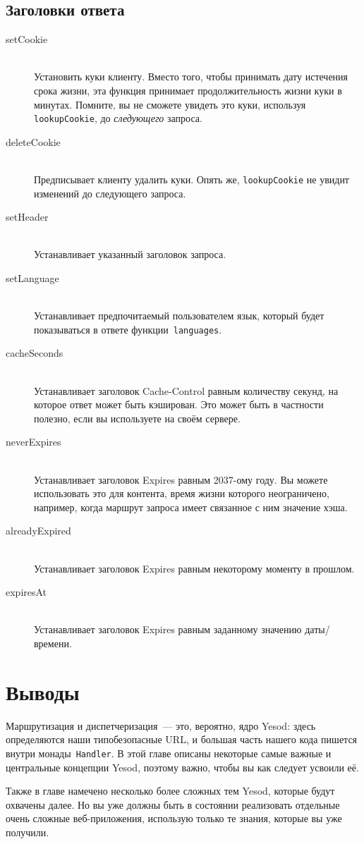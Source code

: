 \subsection{Заголовки ответа}
\begin{description}
\item[setCookie] \hfill \\
Установить куки клиенту. Вместо того, чтобы принимать дату истечения
срока жизни, эта функция принимает продолжительность жизни куки в
минутах. Помните, вы не сможете увидеть это куки, используя
\lstinline!lookupCookie!, до \emph{следующего} запроса.

\item[deleteCookie] \hfill \\
Предписывает клиенту удалить куки. Опять же, \lstinline!lookupCookie! не
увидит изменений до следующего запроса.

\item[setHeader] \hfill \\
Устанавливает указанный заголовок запроса.

\item[setLanguage] \hfill \\
Устанавливает предпочитаемый пользователем язык, который будет
показываться в ответе функции~\lstinline!languages!.

\item[cacheSeconds] \hfill \\
  Устанавливает заголовок Cache-Control равным количеству секунд, на которое
  ответ может быть кэширован. Это может быть в частности полезно, если вы используете
   на своём сервере.

\item[neverExpires] \hfill \\
  Устанавливает заголовок Expires равным 2037-ому году. Вы можете использовать
  это для контента, время жизни которого неограничено, например, когда маршрут запроса
  имеет связанное с ним значение хэша.

\item[alreadyExpired] \hfill \\
Устанавливает заголовок Expires равным некоторому моменту в прошлом.

\item[expiresAt] \hfill \\
Устанавливает заголовок Expires равным заданному значению даты/времени.
\end{description}

\section{Выводы}
Маршрутизация и диспетчеризация~--- это, вероятно, ядро Yesod: здесь
определяются наши типобезопасные URL, и большая часть нашего кода
пишется внутри монады~\lstinline!Handler!. В этой главе описаны
некоторые самые важные и центральные концепции Yesod, поэтому важно,
чтобы вы как следует усвоили её.

Также в главе намечено несколько более сложных тем Yesod, которые
будут охвачены далее. Но вы уже должны быть в состоянии реализовать
отдельные очень сложные веб-приложения, использую только те знания,
которые вы уже получили.
